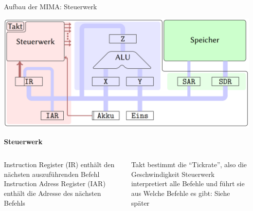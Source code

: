 \documentclass[handout]{beamer}
\begin{document}
\begin{frame}{Aufbau der MIMA: Steuerwerk}
	\begin{center}\includegraphics[width=.6\textwidth]{images/mima_aufbau.png}\end{center}
	
	\bp
	
	\textcolor{kit-red50}{\textbf{Steuerwerk}}
	
	\begin{columns}
		\begin{column}{0.5\textwidth}
			\begin{itemize}
				\pitem Instruction Register (IR) enthält den nächsten auszuführenden Befehl
				\pitem Instruction Adress Register (IAR) enthält die Adresse des nächsten Befehls
			\end{itemize}
		\end{column}
		
		\begin{column}{0.5\textwidth}
			\begin{itemize}
				\pitem Takt bestimmt die ``Tickrate'', also die Geschwindigkeit
				\pitem Steuerwerk interpretiert alle Befehle und führt sie aus
				\pitem Welche Befehle es gibt: Siehe später
			\end{itemize}
		\end{column}
	\end{columns}
	
\end{frame}
\end{document}
